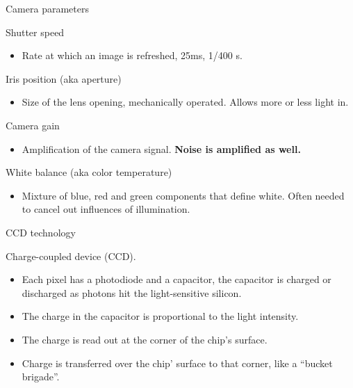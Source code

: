 \documentclass[compress]{beamer}
\providecommand{\tightlist}{%
  \setlength{\itemsep}{0pt}\setlength{\parskip}{0pt}}
\begin{document}
\begin{frame}{Camera parameters}

Shutter speed

\begin{itemize}
\tightlist
\item
  Rate at which an image is refreshed, \eg 25ms, 1/400 s.
\end{itemize}

Iris position (aka aperture)

\begin{itemize}
\tightlist
\item
  Size of the lens opening, mechanically operated. Allows more or less
  light in.
\end{itemize}

Camera gain

\begin{itemize}
\tightlist
\item
  Amplification of the camera signal. \textbf{Noise is amplified as
  well.}
\end{itemize}

White balance (aka color temperature)

\begin{itemize}
\tightlist
\item
  Mixture of blue, red and green components that define white. Often
  needed to cancel out influences of illumination.
\end{itemize}

\end{frame}

\begin{frame}{CCD technology}

Charge-coupled device (CCD).

\begin{itemize}
\tightlist
\item
  Each pixel has a photodiode and a capacitor, the capacitor is charged
  or discharged as photons hit the light-sensitive silicon.
\item
  The charge in the capacitor is proportional to the light intensity.
\item
  The charge is read out at the corner of the chip's surface.
\item
  Charge is transferred over the chip' surface to that corner, like a
  ``bucket brigade''.
\end{itemize}

\end{frame}
\end{document}
